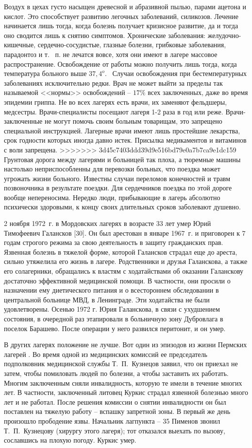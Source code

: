 \documentclass{book}
\begin{document}
Воздух в цехах густо насыщен древесной и абразивной пылью, парами ацетона и кислот. Это способствует развитию легочных заболеваний, силикозов. Лечение начинается лишь тогда, когда болезнь получает кризисное развитие, да и тогда оно сводится лишь к снятию симптомов. Хронические заболевания: желудочно-кишечные, сердечно-сосудистые, глазные болезни, грибковые заболевания, парадонтоз и т.~ п. не лечатся вовсе, хотя они имеют в лагере массовое распространение. Освобождение от работы можно получить лишь тогда, когда температура больного выше $37,4^{o}$.  Случаи освобождения при бестемпературных заболеваниях исключительно редки. Врач не может выйти за пределы так называемой <<нормы>> освобождений -- $17\%$ всех заключенных, даже во время эпидемии гриппа. Не во всех лагерях есть врачи, их заменяют фельдшеры, медсестры. Врачи-специалисты посещают лагеря 1-2 раза в год или реже. Врачи-заключенные не могут помочь своим больным товарищам, это запрещено специальной инструкцией. Лагерные врачи имеют лишь простейшие 
лекарства, срок годности кото­рых иногда давно истек. Присылка медикаментов и витаминов с воли запрещена.
>>>>>>> 3d45c7403ddd39d9e516bd79e0a7b7ca9e1dc159
Грунтовая дорога между лагерями и больницей так плоха, а тюремные машины настолько неприспособленны для перевозки больных, что поездка может угрожать жизни больного. Известны случаи переломов конечностей и травм позвоночника в результате поездки. Для сердечников поездка по этой дороге вообще непереносима. Нередко люди, прибывающие в лагерь абсолютно психически здоровыми, к концу своих длительных сроков заболевают душевно.

2 ноября 1972~г. в Мордовских лагерях в возрасте 33 лет умер Юрий Тимофеевич Галансков [30]. Он был арестован в январе 1967~г. и приговорен к 7 годам строгого режима за свою деятельность в защиту гражданских прав. Язвенная болезнь в тяжелой форме, которой Галансков страдал еще до ареста, сильно утяжелила его жизнь в лагере. Родственники и друзья Галанскова, а также его солагерники, обращались к властям с ходатайствами об оказании Галанскову достаточно эффективной медицинской помощи. В частности, они просили о назначении ему диетического питания и о всестороннем обследова­нии в центральной больнице МВД, в Ленинграде. Эти ходатайства не были удовлетворены. Осенью 1972 г. Юрия Галанскова, в связи с ухудшением состояния, в очередной раз этапировали в больничную зону Дубровлага в поселок Барашево. После операции у него развился перитонит, и он умер.

В других лагерях положение не лучше. Вот один из эпизодов из жизни Пермских лагерей . Во время одной из медицинских комиссий ее председатель подполковник медицинской службы Т.~П.~Кузнецов заявил, что он приехал не затем, чтобы помиловать людей по болезни, а чтобы заставить их работать. Многим заключенным сняли инвалидность, которую те имели в течение многих лет. В частности, заключенный литовец Куркис страдал язвенной болезнью много лет и не работал. После решения комиссии о снятии инвалидности он был поставлен на тяжелую работу -- вспашку запретной зоны. В первый же день произошло прободение язвы. Начальник лагпункта -- 35 Пименов звонил Т.~П.~Кузнецову (хирургу этого лагеря); тот отказался выехать по вызову, сославшись на плохую погоду. Куркис умер.
\end{document}
